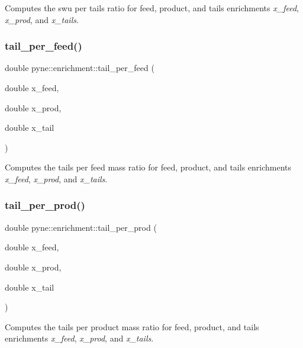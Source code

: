Computes the swu per tails ratio for feed, product, and tails enrichments {\itshape x\+\_\+feed}, {\itshape x\+\_\+prod}, and {\itshape x\+\_\+tails}. \mbox{\label{namespacepyne_1_1enrichment_a86ccc9aa699994c1bfc44ba2b6104acb}} 
\subsubsection{\texorpdfstring{tail\+\_\+per\+\_\+feed()}{tail\_per\_feed()}}
{\footnotesize\ttfamily double pyne\+::enrichment\+::tail\+\_\+per\+\_\+feed (\begin{DoxyParamCaption}\item[{double}]{x\+\_\+feed,  }\item[{double}]{x\+\_\+prod,  }\item[{double}]{x\+\_\+tail }\end{DoxyParamCaption})}

Computes the tails per feed mass ratio for feed, product, and tails enrichments {\itshape x\+\_\+feed}, {\itshape x\+\_\+prod}, and {\itshape x\+\_\+tails}. \mbox{\label{namespacepyne_1_1enrichment_a34832108a2dfff7dafd33e85ca4eeded}} 
\subsubsection{\texorpdfstring{tail\+\_\+per\+\_\+prod()}{tail\_per\_prod()}}
{\footnotesize\ttfamily double pyne\+::enrichment\+::tail\+\_\+per\+\_\+prod (\begin{DoxyParamCaption}\item[{double}]{x\+\_\+feed,  }\item[{double}]{x\+\_\+prod,  }\item[{double}]{x\+\_\+tail }\end{DoxyParamCaption})}

Computes the tails per product mass ratio for feed, product, and tails enrichments {\itshape x\+\_\+feed}, {\itshape x\+\_\+prod}, and {\itshape x\+\_\+tails}. 